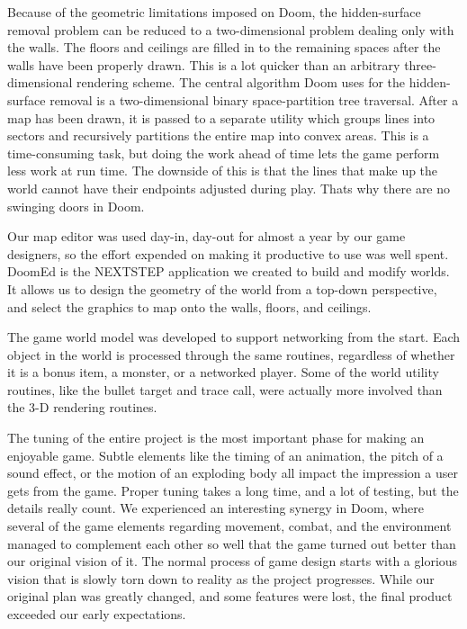 Because of the geometric limitations imposed on Doom, the hidden-surface removal problem can be reduced to a two-dimensional problem dealing only with the walls. The floors and ceilings are filled in to the remaining spaces after the walls have been properly drawn. This is a lot quicker than an arbitrary three-dimensional rendering scheme. The central algorithm Doom uses for the hidden-surface removal is a two-dimensional binary space-partition tree traversal. After a map has been drawn, it is passed to a separate utility which groups lines into sectors and recursively partitions the entire map into convex areas. This is a time-consuming task, but doing the work ahead of time lets the game perform less work at run time. The downside of this is that the lines that make up the world cannot have their endpoints adjusted during play. Thats why there are no swinging doors in Doom.\\
\par

Our map editor was used day-in, day-out for almost a year by our game designers, so the effort expended on making it productive to use was well spent. DoomEd is the NEXTSTEP application we created to build and modify worlds. It allows us to design the geometry of the world from a top-down perspective, and select the graphics to map onto the walls, floors, and ceilings.\\
\par

The game world model was developed to support networking from the start. Each object in the world is processed through the same routines, regardless of whether it is a bonus item, a monster, or a networked player. Some of the world utility routines, like the bullet target and trace call, were actually more involved than the 3-D rendering routines.\\
\par

The tuning of the entire project is the most important phase for making an enjoyable game. Subtle elements like the timing of an animation, the pitch of a sound effect, or the motion of an exploding body all impact the impression a user gets from the game. Proper tuning takes a long time, and a lot of testing, but the details really count. We experienced an interesting synergy in Doom, where several of the game elements regarding movement, combat, and the environment managed to complement each other so well that the game turned out better than our original vision of it. The normal process of game design starts with a glorious vision that is slowly torn down to reality as the project progresses. While our original plan was greatly changed, and some features were lost, the final product exceeded our early expectations.\\

